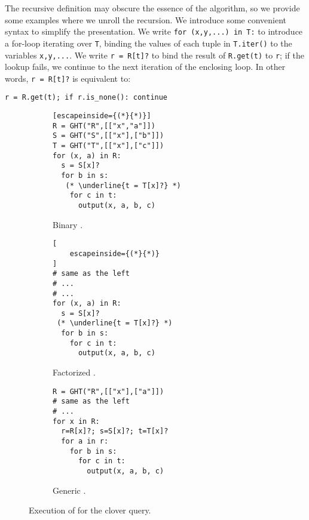 The recursive definition may obscure the essence of the \FJ algorithm,
so we provide some examples where we unroll the recursion.
We introduce some convenient syntax to simplify the presentation.
We write \lstinline|for (x,y,...) in T:|
to introduce a for-loop iterating over \lstinline|T|,
binding the values of each tuple in \lstinline|T.iter()|
to the variables \lstinline|x,y,...|.
We write \lstinline|r = R[t]?| to bind the result of
\lstinline|R.get(t)| to \lstinline|r|;
if the lookup fails, we continue to the next iteration of the
enclosing loop.
In other words, \texttt{r = R[t]?} is equivalent to:
%
\begin{lstlisting}
r = R.get(t); if r.is_none(): continue
\end{lstlisting}

\begin{figure*}
  \begin{subfigure}[b]{0.3\linewidth}
    \begin{lstlisting}[escapeinside={(*}{*)}]
R = GHT("R",[["x","a"]])
S = GHT("S",[["x"],["b"]])
T = GHT("T",[["x"],["c"]])
for (x, a) in R:
  s = S[x]?
  for b in s:
   (* \underline{t = T[x]?} *)
    for c in t:
      output(x, a, b, c)
\end{lstlisting}
    \caption{Binary \FJ.}
    \label{fig:bj-loop}
  \end{subfigure}
  \hspace{1.5em}
  \begin{subfigure}[b]{0.3\linewidth}
    \centering
    \begin{lstlisting}[
    escapeinside={(*}{*)}
]
# same as the left
# ...
# ...
for (x, a) in R:
  s = S[x]?
 (* \underline{t = T[x]?} *)
  for b in s:
    for c in t:
      output(x, a, b, c)
\end{lstlisting}
    \caption{Factorized \FJ.}
    \label{fig:factorized-loop}
  \end{subfigure}
  \hspace{.5em}
  \begin{subfigure}[b]{0.3\linewidth}
    \centering
    \begin{lstlisting}
R = GHT("R",[["x"],["a"]])
# same as the left
# ...
for x in R:
  r=R[x]?; s=S[x]?; t=T[x]?
  for a in r:
    for b in s:
      for c in t:
        output(x, a, b, c)
\end{lstlisting}
    \caption{Generic \FJ.}
    \label{fig:gj-loop}
  \end{subfigure}
  \caption{Execution of \FJ for the clover query.}
\end{figure*}

